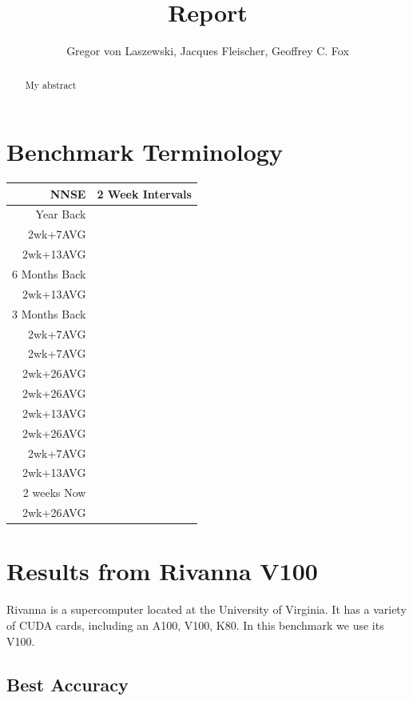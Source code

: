 \documentclass[11pt,twocolumn]{article}
\title{Report}
\author{Gregor von Laszewski, Jacques Fleischer, Geoffrey C. Fox}
\begin{document}
\maketitle

\begin{abstract}

My abstract

\end{abstract}

\tableofcontents

\section{Benchmark Terminology}

\begin{tabular}{rl}
NNSE & 2 Week Intervals \\
\hline
Year Back & \\ %
2wk+7AVG & \\ %
2wk+13AVG & \\
6 Months Back & \\
2wk+13AVG & \\
3 Months Back & \\
2wk+7AVG & \\
2wk+7AVG & \\
2wk+26AVG & \\
2wk+26AVG & \\
2wk+13AVG & \\
2wk+26AVG & \\
2wk+7AVG & \\
2wk+13AVG & \\
2 weeks Now & \\
2wk+26AVG & \\
\hline
\end{tabular}

\section{Results from Rivanna V100}

Rivanna is a supercomputer located at the University
of Virginia. It has a variety of CUDA cards, including
an A100, V100, K80. In this benchmark we use its V100.

\subsection{Best Accuracy}
\end{document}
